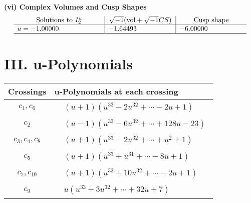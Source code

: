 \documentclass[1p]{elsarticle_modified}
\theoremstyle{definition}
\newcommand{\I}{\sqrt{-1}}
\begin{document}
\newpage\flushleft \textbf{(vi) Complex Volumes and Cusp Shapes}
$$\begin{array}{c|c|c}  
\text{Solutions to }I^u_{2}& \I (\text{vol} + \sqrt{-1}CS) & \text{Cusp shape}\\
 \hline 
\begin{aligned}
u &= -1.00000\phantom{ +0.000000I}\end{aligned}
 & -1.64493\phantom{ +0.000000I} & -6.00000\phantom{ +0.000000I}\\
 \hline 
 \end{array}$$\newpage
\newpage\renewcommand{\arraystretch}{1}
\centering \section*{ III. u-Polynomials}
\begin{tabular}{m{50pt}|m{274pt}}
Crossings & \hspace{64pt}u-Polynomials at each crossing \\
\hline $$\begin{aligned}c_{1},c_{6}\end{aligned}$$&$\begin{aligned}
&(u+1)(u^{33}-2 u^{32}+\cdots-2 u+1)
\end{aligned}$\\
\hline $$\begin{aligned}c_{2}\end{aligned}$$&$\begin{aligned}
&(u-1)(u^{33}-6 u^{32}+\cdots+128 u-23)
\end{aligned}$\\
\hline $$\begin{aligned}c_{3},c_{4},c_{8}\end{aligned}$$&$\begin{aligned}
&(u+1)(u^{33}-2 u^{32}+\cdots+u^2+1)
\end{aligned}$\\
\hline $$\begin{aligned}c_{5}\end{aligned}$$&$\begin{aligned}
&(u+1)(u^{33}+u^{31}+\cdots-8 u+1)
\end{aligned}$\\
\hline $$\begin{aligned}c_{7},c_{10}\end{aligned}$$&$\begin{aligned}
&(u+1)(u^{33}+10 u^{32}+\cdots-2 u+1)
\end{aligned}$\\
\hline $$\begin{aligned}c_{9}\end{aligned}$$&$\begin{aligned}
&u(u^{33}+3 u^{32}+\cdots+32 u+7)
\end{aligned}$\\
\hline
\end{tabular}\newpage\renewcommand{\arraystretch}{1}
\end{document}
